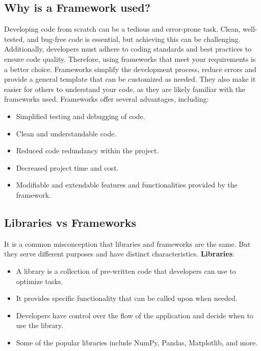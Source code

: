 \subsection{Why is a Framework used?}
Developing code from scratch can be a tedious and error-prone task. Clean, well-tested, and bug-free code is essential, but achieving this can be challenging.
Additionally, developers must adhere to coding standards and best practices to ensure code quality. Therefore, using frameworks that meet your requirements is
a better choice. Frameworks simplify the development process, reduce errors and provide a general template that can be customized as needed. They also make it
easier for others to understand your code, as they are likely familiar with the frameworks used. Frameworks offer several advantages, including:
\begin{itemize}
    \item Simplified testing and debugging of code.
    \item Clean and understandable code.
    \item Reduced code redundancy within the project.
    \item Decreased project time and cost.
    \item Modifiable and extendable features and functionalities provided by the framework.
\end{itemize}

\subsection{Libraries vs Frameworks}It is a common misconception that libraries and frameworks are the same. But they serve different purposes and have distinct characteristics. \newline \newline
\textbf{Libraries}:
\begin{itemize}
    \item A library is a collection of pre-written code that developers can use to optimize tasks.
    \item It provides specific functionality that can be called upon when needed.
    \item Developers have control over the flow of the application and decide when to use the library.
    \item Some of the popular libraries include NumPy, Pandas, Matplotlib, and more.\newline
\end{itemize}


